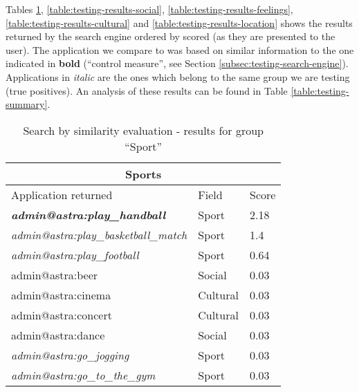 Tables \ref{table:testing-results-sport}, \ref{table:testing-results-social},
\ref{table:testing-results-feelings}, \ref{table:testing-results-cultural} and
\ref{table:testing-results-location} shows the results returned by the search
engine ordered by scored (as they are presented to the user).
The application we compare to was based on similar information
to the one indicated in \textbf{bold} (``control measure'', see Section 
\ref{subsec:testing-search-engine}). Applications in \textit{italic} are the
ones which belong to the same group we are testing (true positives).
An analysis of these results can be found in Table \ref{table:testing-summary}.

\begin{table}[h!]
	\tiny
    \begin{center}
		\begin{tabular}{||l|l|l||}

		\hline \hline
		\multicolumn{3}{||c||}{\bfseries{Sports}} \\
		\hline \hline
			Application returned & Field & Score \\
			\hline \hline
			\textit{\textbf{admin@astra:play\_handball}} & Sport & 2.18\\
			\hline
			\textit{admin@astra:play\_basketball\_match}&	Sport	&	1.4	\\	
			\hline
			\textit{admin@astra:play\_football}	&	Sport	&	0.64	\\
			\hline
			admin@astra:beer	&	Social	&	0.03	\\
			\hline
			admin@astra:cinema	&	Cultural	&	0.03	\\
			\hline
			admin@astra:concert	&	Cultural	&	0.03	\\
			\hline
			admin@astra:dance	&	Social	&	0.03	\\
			\hline
			\textit{admin@astra:go\_jogging} &	Sport	&	0.03	\\
			\hline
			\textit{admin@astra:go\_to\_the\_gym}	&	Sport	&	0.03	\\
		\hline \hline

		\end{tabular}
		\caption{\label{table:testing-results-sport}Search by similarity evaluation
		- results for group ``Sport''}
	\end{center}
\end{table} 

